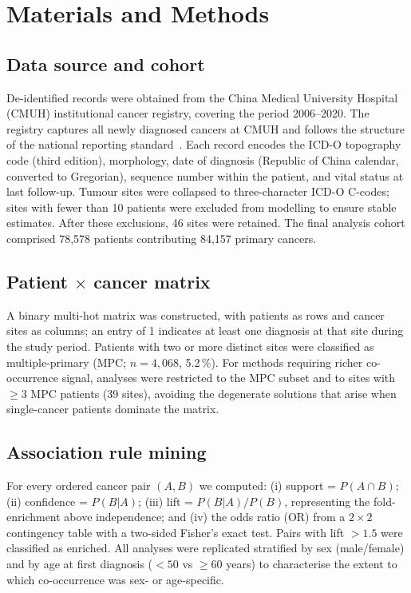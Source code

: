 \documentclass[review,12pt]{elsarticle}
\begin{document}
\section{Materials and Methods}

\subsection{Data source and cohort}
De-identified records were obtained from the China Medical University Hospital
(CMUH) institutional cancer registry, covering the period 2006--2020. The
registry captures all newly diagnosed cancers at CMUH and follows the structure
of the national reporting standard~\cite{Chiang2019}. Each record encodes the ICD-O topography code (third
edition), morphology, date of diagnosis (Republic of China calendar, converted
to Gregorian), sequence number within the patient, and vital status at last
follow-up. Tumour sites were collapsed to three-character ICD-O C-codes; sites
with fewer than 10 patients were excluded from modelling to ensure stable
estimates. After these exclusions, 46 sites were retained. The final analysis
cohort comprised 78,578 patients contributing 84,157 primary cancers.

\subsection{Patient $\times$ cancer matrix}
A binary multi-hot matrix was constructed, with patients as rows and cancer
sites as columns; an entry of 1 indicates at least one diagnosis at that site
during the study period. Patients with two or more distinct sites were
classified as multiple-primary (MPC; $n = 4,068$, 5.2\,\%). For methods
requiring richer co-occurrence signal, analyses were restricted to the MPC
subset and to sites with $\geq 3$ MPC patients (39 sites), avoiding the
degenerate solutions that arise when single-cancer patients dominate the matrix.

\subsection{Association rule mining}
For every ordered cancer pair $(A, B)$ we computed: (i) support = $P(A \cap B)$;
(ii) confidence = $P(B|A)$; (iii) lift = $P(B|A)/P(B)$, representing the
fold-enrichment above independence; and (iv) the odds ratio (OR) from a
$2 \times 2$ contingency table with a two-sided Fisher's exact test. Pairs with
lift $> 1.5$ were classified as enriched. All analyses were replicated stratified
by sex (male/female) and by age at first diagnosis ($<50$ vs $\geq 60$ years) to
characterise the extent to which co-occurrence was sex- or age-specific.
\end{document}
